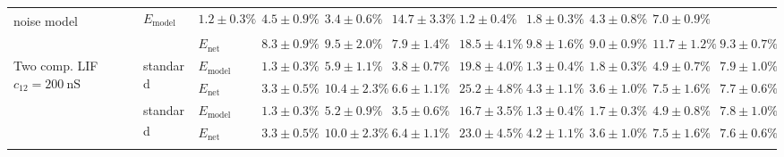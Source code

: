 \begin{sidewaystable}
\begin{tabular}{p{2.2cm} p{1.7cm} l r r r r r r r r }
{	noise model\textsuperscript{\dag}} &
	$E_\mathrm{model}$ & 
	\color{Gray}$1.2 \pm 0.3\%$ & \color{Gray}$4.5 \pm 0.9\%$ & \color{Gray}$3.4 \pm 0.6\%$ & \color{Gray}$14.7 \pm 3.3\%$ & \color{Gray}$\mathbf{1.2 \pm 0.4\%}$ & \color{Gray}$1.8 \pm 0.3\%$ & \color{Gray}$4.3 \pm 0.8\%$ & \color{Gray}$7.0 \pm 0.9\%$
	\\
	& & 
	$E_\mathrm{net}$ &
	\cellcolor{White!19!SteelBlue}$8.3 \pm 0.9\%$ & \cellcolor{White!50!SteelBlue}$9.5 \pm 2.0\%$ & \cellcolor{White!38!SteelBlue}$7.9 \pm 1.4\%$ & \cellcolor{White!63!SteelBlue}$18.5 \pm 4.1\%$ & \cellcolor{White!7!SteelBlue}$9.8 \pm 1.6\%$ & \cellcolor{White!25!SteelBlue}$9.0 \pm 0.9\%$ & \cellcolor{White!25!SteelBlue}$11.7 \pm 1.2\%$ & \cellcolor{White!38!SteelBlue}$9.3 \pm 0.7\%$
	\\\midrule
	\multirow{8}{2.2cm}{\raggedleft %
	Two comp. LIF $c_{12} = \SI{200}{\nano\siemens}$} &
	\multirow{2}{1.7cm}{\raggedleft %
	standard} &
	$E_\mathrm{model}$ & 
	\color{Gray}$1.3 \pm 0.3\%$ & \color{Gray}$5.9 \pm 1.1\%$ & \color{Gray}$3.8 \pm 0.7\%$ & \color{Gray}$19.8 \pm 4.0\%$ & \color{Gray}$1.3 \pm 0.4\%$ & \color{Gray}$1.8 \pm 0.3\%$ & \color{Gray}$4.9 \pm 0.7\%$ & \color{Gray}$7.9 \pm 1.0\%$
	\\
	& & 
	$E_\mathrm{net}$ &
	\cellcolor{White!69!SteelBlue}$3.3 \pm 0.5\%$ & \cellcolor{White!25!SteelBlue}$10.4 \pm 2.3\%$ & \cellcolor{White!63!SteelBlue}$6.6 \pm 1.1\%$ & \cellcolor{White!19!SteelBlue}$25.2 \pm 4.8\%$ & \cellcolor{White!69!SteelBlue}$4.3 \pm 1.1\%$ & \cellcolor{White!69!SteelBlue}$3.6 \pm 1.0\%$ & \cellcolor{White!69!SteelBlue}$7.5 \pm 1.6\%$ & \cellcolor{White!57!SteelBlue}$7.7 \pm 0.6\%$
	\\\cmidrule(l){2-11}
	&
	\multirow{2}{1.7cm}{\raggedleft %
	standard\textsuperscript{\dag}} &
	$E_\mathrm{model}$ & 
	\color{Gray}$1.3 \pm 0.3\%$ & \color{Gray}$5.2 \pm 0.9\%$ & \color{Gray}$3.5 \pm 0.6\%$ & \color{Gray}$16.7 \pm 3.5\%$ & \color{Gray}$1.3 \pm 0.4\%$ & \color{Gray}$1.7 \pm 0.3\%$ & \color{Gray}$4.9 \pm 0.8\%$ & \color{Gray}$7.8 \pm 1.0\%$
	\\
	& & 
	$E_\mathrm{net}$ &
	\cellcolor{White!75!SteelBlue}$3.3 \pm 0.5\%$ & \cellcolor{White!44!SteelBlue}$10.0 \pm 2.3\%$ & \cellcolor{White!69!SteelBlue}$6.4 \pm 1.1\%$ & \cellcolor{White!25!SteelBlue}$23.0 \pm 4.5\%$ & \cellcolor{White!75!SteelBlue}$4.2 \pm 1.1\%$ & \cellcolor{White!75!SteelBlue}$3.6 \pm 1.0\%$ & \cellcolor{White!75!SteelBlue}$7.5 \pm 1.6\%$ & \cellcolor{White!63!SteelBlue}$7.6 \pm 0.6\%$
	\\\cmidrule(l){2-11}
	&
	\multirow{2}{1.7cm}{\raggedleft %
}
\end{tabular}
\end{sidewaystable}
